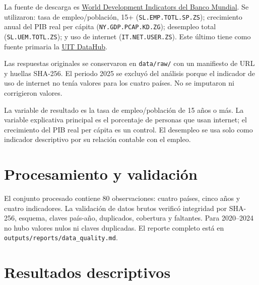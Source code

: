 \documentclass[
  spanish,
  letterpaper,
  DIV=11,
  numbers=noendperiod]{scrartcl}
\begin{document}
La fuente de descarga es
\href{https://databank.worldbank.org/source/world-development-indicators}{World
Development Indicators del Banco Mundial}. Se utilizaron: tasa de
empleo/población, 15+ (\texttt{SL.EMP.TOTL.SP.ZS}); crecimiento anual
del PIB real per cápita (\texttt{NY.GDP.PCAP.KD.ZG}); desempleo total
(\texttt{SL.UEM.TOTL.ZS}); y uso de internet (\texttt{IT.NET.USER.ZS}).
Este último tiene como fuente primaria la
\href{https://datahub.itu.int/}{UIT DataHub}.

Las respuestas originales se conservaron en \texttt{data/raw/} con un
manifiesto de URL y huellas SHA-256. El periodo 2025 se excluyó del
análisis porque el indicador de uso de internet no tenía valores para
los cuatro países. No se imputaron ni corrigieron valores.

La variable de resultado es la tasa de empleo/población de 15 años o
más. La variable explicativa principal es el porcentaje de personas que
usan internet; el crecimiento del PIB real per cápita es un control. El
desempleo se usa solo como indicador descriptivo por su relación
contable con el empleo.

\section{Procesamiento y
validación}\label{procesamiento-y-validaciuxf3n}

El conjunto procesado contiene 80 observaciones: cuatro países, cinco
años y cuatro indicadores. La validación de datos brutos verificó
integridad por SHA-256, esquema, claves país-año, duplicados, cobertura
y faltantes. Para 2020--2024 no hubo valores nulos ni claves duplicadas.
El reporte completo está en \texttt{outputs/reports/data\_quality.md}.

\section{Resultados descriptivos}\label{resultados-descriptivos}
\end{document}
